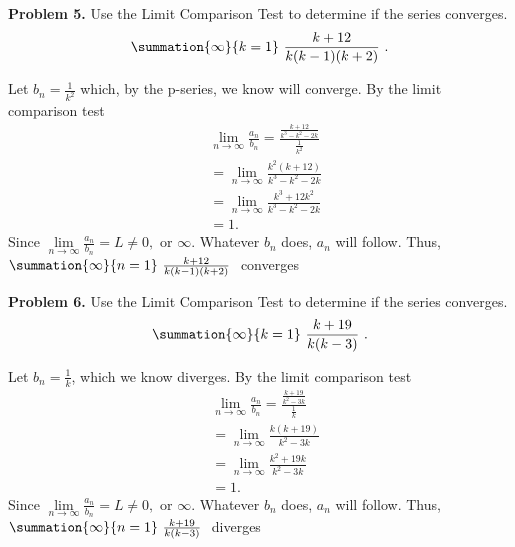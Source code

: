 \documentclass{report}
\begin{document}
    \bigbreak \noindent 
    \begin{mdframed}
        \textbf{Problem 5.} Use the Limit Comparison Test to determine if the series converges.
        \begin{align*}
            \summation{\infty}{k=1}\ \frac{k+12}{k(k-1)(k+2)}\ 
        .\end{align*}
    \end{mdframed}
    \bigbreak \noindent 
    Let $b_{n} = \frac{1}{k^{2}}$ which, by the p-series, we know will converge. By the limit comparison test
    \begin{align*}
        &\lim\limits_{n \to \infty}{\frac{a_{n}}{b_{n}}} = \frac{\frac{k+12}{k^{3}-k^{2}-2k}}{\frac{1}{k^{2}}} \\
        &=\lim\limits_{n \to \infty}{\frac{k^{2}(k+12)}{k^{3}-k^{2}-2k}} \\
        &=\lim\limits_{n \to \infty}{\frac{k^{3}+12k^{2}}{k^{3}-k^{2}-2k}} \\
        &=1
    .\end{align*}
    Since $\lim\limits_{n \to \infty}{\frac{a_{n}}{b_{n}}} = L \ne 0, \text{ or } \infty$. Whatever $b_{n}$ does, $a_{n}$ will follow. Thus, $\summation{\infty}{n=1}\ \frac{k+12}{k(k-1)(k+2)}\ $ converges


    \bigbreak \noindent 
    \begin{mdframed}
        \textbf{Problem 6.} Use the Limit Comparison Test to determine if the series converges.
        \begin{align*}
            \summation{\infty}{k=1}\ \frac{k+19}{k(k-3)}\             
        .\end{align*}
    \end{mdframed}
    \bigbreak \noindent 
    Let $b_{n} = \frac{1}{k}$, which we know diverges. By the limit comparison test
    \begin{align*}
        &\lim\limits_{n \to \infty}{\frac{a_{n}}{b_{n}}} = \frac{\frac{k+19}{k^{2}-3k}}{\frac{1}{k}} \\
        &=\lim\limits_{n \to \infty}\frac{k(k+19)}{k^{2}-3k} \\
        &=\lim\limits_{n \to \infty}\frac{k^{2}+19k}{k^{2}-3k} \\
        &=1
    .\end{align*}
    \bigbreak \noindent 
    Since $\lim\limits_{n \to \infty}{\frac{a_{n}}{b_{n}}} = L \ne 0, \text{ or } \infty$. Whatever $b_{n}$ does, $a_{n}$ will follow. Thus, $\summation{\infty}{n=1}\ \frac{k+19}{k(k-3)}\ $ diverges

    
\end{document}

